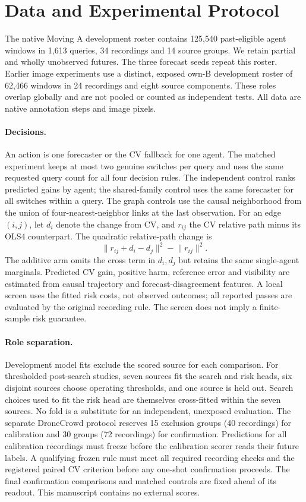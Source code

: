\section{Data and Experimental Protocol}
The native Moving A development roster contains 125,540
past-eligible agent windows in 1,613 queries, 34 recordings and
14 source groups. We retain partial and wholly unobserved futures.
The three forecast seeds repeat this roster. Earlier image experiments
use a distinct, exposed own-B development roster of 62,466 windows
in 24 recordings and eight source components. These roles overlap
globally and are not pooled or counted as independent tests.
All data are native annotation steps and image pixels.

\paragraph{Decisions.}
An action is one forecaster or the CV fallback for one agent. The
matched experiment keeps at most two genuine switches per query and
uses the same requested query count for all four decision rules.
The independent control ranks predicted gains by agent; the
shared-family control uses the same forecaster for all switches
within a query. The graph controls use the causal neighborhood
from the union of four-nearest-neighbor links at the last observation.
For an edge $(i,j)$, let $d_i$ denote the change from CV, and $r_{ij}$
the CV relative path minus its OLS4 counterpart. The quadratic
relative-path change is
\[
  \lVert r_{ij}+d_i-d_j\rVert^2-\lVert r_{ij}\rVert^2 .
\]
The additive arm omits the cross term in $d_i,d_j$ but retains
the same single-agent marginals. Predicted CV gain, positive harm,
reference error and visibility are estimated from causal trajectory
and forecast-disagreement features. A local screen uses the fitted
risk costs, not observed outcomes; all reported passes are evaluated
by the original recording rule. The screen does not imply a
finite-sample risk guarantee.

\paragraph{Role separation.}
Development model fits exclude the scored source for each comparison.
For thresholded post-search studies, seven sources fit the search
and risk heads, six disjoint sources choose operating thresholds,
and one source is held out. Search choices used to fit the risk head
are themselves cross-fitted within the seven sources. No fold is a
substitute for an independent, unexposed evaluation. The separate
DroneCrowd protocol reserves 15 exclusion groups (40 recordings)
for calibration and 30 groups (72 recordings) for confirmation.
Predictions for all calibration recordings must freeze before the
calibration scorer reads their future labels. A qualifying frozen
rule must meet all required recording checks and the registered
paired CV criterion before any one-shot confirmation proceeds.
The final confirmation comparisons and matched controls are fixed
ahead of its readout. This manuscript contains no external scores.
